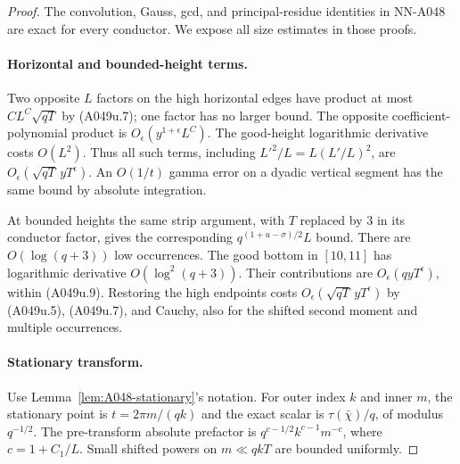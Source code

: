 \begin{proof}
The convolution, Gauss, gcd, and principal-residue identities
in NN-A048 are exact for every conductor. We expose all
size estimates in those proofs.

\paragraph{Horizontal and bounded-height terms.}
Two opposite $L$ factors on the high horizontal edges have
product at most $CL^C\sqrt{qT}$ by (A049u.7); one factor
has no larger bound. The opposite coefficient-polynomial
product is $O_\epsilon(y^{1+\epsilon}L^C)$. The good-height
logarithmic derivative costs $O(L^2)$. Thus all such terms,
including $L'^2/L=L(L'/L)^2$, are
$O_\epsilon(\sqrt{qT}\,yT^\epsilon)$.
An $O(1/t)$ gamma error on a dyadic vertical segment has
the same bound by absolute integration.

At bounded heights the same strip argument, with $T$
replaced by $3$ in its conductor factor, gives the
corresponding $q^{(1+u-\sigma)/2}L$ bound. There are
$O(\log(q+3))$ low occurrences. The good bottom in
$[10,11]$ has logarithmic derivative $O(\log^2(q+3))$.
Their contributions are $O_\epsilon(qyT^\epsilon)$,
within (A049u.9). Restoring the high endpoints costs
$O_\epsilon(\sqrt{qT}\,yT^\epsilon)$ by (A049u.5),
(A049u.7), and Cauchy, also for the shifted second
moment and multiple occurrences.

\paragraph{Stationary transform.}
Use Lemma~\ref{lem:A048-stationary}'s notation. For outer
index $k$ and inner $m$, the stationary point is
$t=2\pi m/(qk)$ and the exact scalar is
$\tau(\bar\chi)/q$, of modulus $q^{-1/2}$.
The pre-transform absolute prefactor is
$q^{c-1/2}k^{c-1}m^{-c}$, where $c=1+C_1/L$.
Small shifted powers on $m\ll qkT$ are bounded uniformly.


\end{proof}
